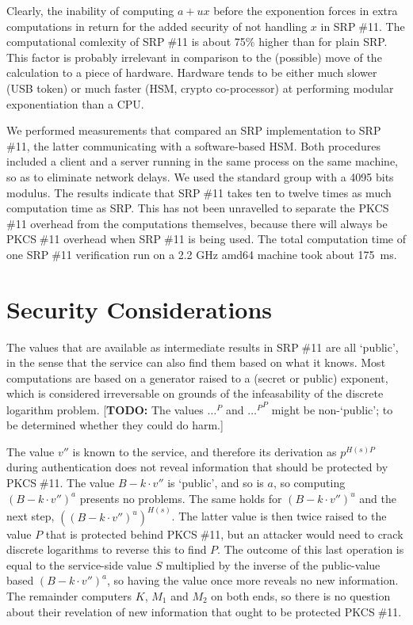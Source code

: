 \documentclass[a4paper,11pt]{article}
\def\pkcs11{PKCS$\;$\#11\xspace}
\def\srp11{SRP$\;$\#11\xspace}
\begin{document}
Clearly, the inability of computing $a+ux$ before the exponention forces in extra computations in return for the added security of not handling $x$ in \srp11.  The computational comlexity of \srp11 is about 75\% higher than for plain SRP.  This factor is probably irrelevant in comparison to the (possible) move of the calculation to a piece of hardware.  Hardware tends to be either much slower (USB token) or much faster (HSM, crypto co-processor) at performing modular exponentiation than a CPU.

We performed measurements that compared an SRP implementation to \srp11, the latter communicating with a software-based HSM.  Both procedures included a client and a server running in the same process on the same machine, so as to eliminate network delays.  We used the standard group with a 4095 bits modulus.  The results indicate that \srp11 takes ten to twelve times as much computation time as SRP.  This has not been unravelled to separate the \pkcs11 overhead from the computations themselves, because there will always be \pkcs11 overhead when \srp11 is being used.  The total computation time of one \srp11 verification run on a 2.2 GHz amd64 machine took about 175~ms.


\section{Security Considerations}

The values that are available as intermediate results in \srp11 are all `public', in the sense that the service can also find them based on what it knows.  Most computations are based on a generator raised to a (secret or public) exponent, which is considered irreversable on grounds of the infeasability of the discrete logarithm problem.  [\textbf{TODO:} The values $\ldots^P$ and ${\ldots^P}^P$ might be non-`public'; to be determined whether they could do harm.]

The value $v''$ is known to the service, and therefore its derivation as $p^{H(s)P}$ during authentication does not reveal information that should be protected by \pkcs11.  The value $B-k\cdot v''$ is `public', and so is $a$, so computing $(B-k\cdot v'')^a$ presents no problems.  The same holds for $(B-k\cdot v'')^u$ and the next step, $((B-k\cdot v'')^u)^{H(s)}$.  The latter value is then twice raised to the value $P$ that is protected behind \pkcs11, but an attacker would need to crack discrete logarithms to reverse this to find $P$.  The outcome of this last operation is equal to the service-side value $S$ multiplied by the inverse of the public-value based $(B-k\cdot v'')^a$, so having the value once more reveals no new information.  The remainder computers $K$, $M_1$ and $M_2$ on both ends, so there is no question about their revelation of new information that ought to be protected \pkcs11.
\end{document}
